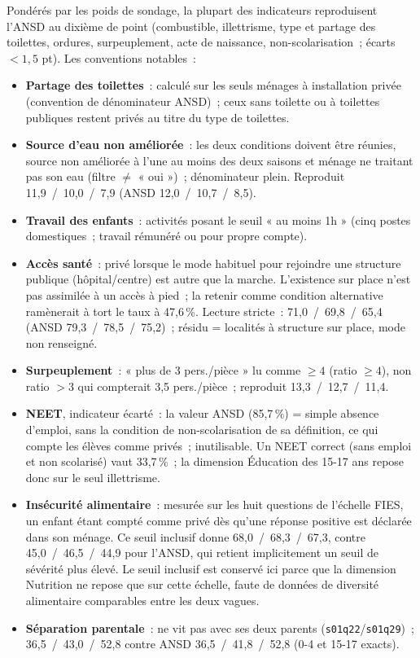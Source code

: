 Pondérés par les poids de sondage, la plupart des indicateurs reproduisent
l'ANSD au dixième de point (combustible, illettrisme, type et partage des
toilettes, ordures, surpeuplement, acte de naissance, non-scolarisation~;
écarts $<1{,}5$ pt). Les conventions notables~:

\begin{itemize}\setlength\itemsep{2pt}
  \item \textbf{Partage des toilettes}~: calculé sur les seuls ménages à
    installation privée (convention de dénominateur ANSD)~; ceux sans toilette
    ou à toilettes publiques restent privés au titre du type de toilettes.
  \item \textbf{Source d'eau non améliorée}~: les deux conditions doivent être
    réunies, source non améliorée à l'une au moins des deux saisons et ménage
    ne traitant pas son eau (filtre $\neq$ « oui »)~; dénominateur plein. Reproduit 11,9~/~10,0~/~7,9 (ANSD 12,0~/~10,7~/~8,5).
  \item \textbf{Travail des enfants}~: activités posant le seuil « au moins 1h »
    (cinq postes domestiques~; travail rémunéré ou pour propre compte).
  \item \textbf{Accès santé}~: privé lorsque le mode habituel pour rejoindre
    une structure publique (hôpital/centre) est autre que la marche.
    L'existence sur place n'est pas assimilée à un accès à pied~; la retenir
    comme condition alternative ramènerait à tort le taux à 47,6\,\%. Lecture
    stricte~:
    71,0~/~69,8~/~65,4 (ANSD 79,3~/~78,5~/~75,2)~; résidu = localités à structure
    sur place, mode non renseigné.
  \item \textbf{Surpeuplement}~: « plus de 3 pers./pièce » lu comme $\geq 4$
    (ratio $\geq 4$), non ratio $>3$ qui compterait 3,5 pers./pièce~;
    reproduit 13,3~/~12,7~/~11,4.
  \item \textbf{NEET}, indicateur écarté~: la valeur ANSD (85,7\,\%) = simple
    absence d'emploi, sans la condition de non-scolarisation de sa définition,
    ce qui compte les élèves comme privés~; inutilisable. Un NEET correct
    (sans emploi et non scolarisé) vaut 33,7\,\%~; la dimension Éducation
    des 15-17 ans repose donc sur le seul illettrisme.
  \item \textbf{Insécurité alimentaire}~: mesurée sur les huit questions de
    l'échelle FIES, un enfant étant compté comme privé dès qu'une réponse
    positive est déclarée dans son ménage. Ce seuil inclusif donne
    68,0~/~68,3~/~67,3, contre 45,0~/~46,5~/~44,9 pour l'ANSD, qui retient
    implicitement un seuil de sévérité plus élevé. Le seuil inclusif est
    conservé ici parce que la dimension Nutrition ne repose que sur cette
    échelle, faute de données de diversité alimentaire comparables entre les
    deux vagues.
  \item \textbf{Séparation parentale}~: ne vit pas avec ses deux parents
    (\texttt{s01q22}/\texttt{s01q29})~; 36,5~/~43,0~/~52,8 contre ANSD
    36,5~/~41,8~/~52,8 (0-4 et 15-17 exacts).
\end{itemize}

